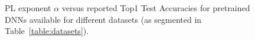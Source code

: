 \begin{figure}[t]
{    }
    \qquad
    \caption{PL exponent $\alpha$ versus reported Top1 Test Accuracies for pretrained DNNs available for different datasets (as segmented in Table~\ref{table:datasets}).
            }
    \label{fig:DSalphas}
\end{figure}

